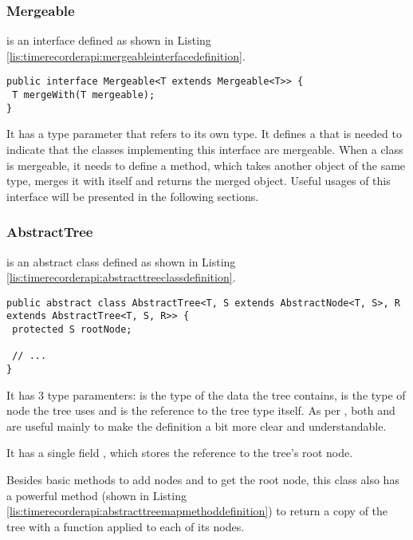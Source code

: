 \subsubsection{Mergeable}
 is an interface defined as shown in Listing \ref{lis:timerecorderapi:mergeableinterfacedefinition}.

\begin{lstlisting}[breaklines,caption={Mergeable interface definition},label=lis:timerecorderapi:mergeableinterfacedefinition]
public interface Mergeable<T extends Mergeable<T>> {
 T mergeWith(T mergeable);
}
\end{lstlisting}

\noindent It has a type parameter  that refers to its own type. It defines a  that is needed to indicate that the classes implementing this interface are mergeable. When a class is mergeable, it needs to define a  method, which takes another object of the same type, merges it with itself and returns the merged object. Useful usages of this interface will be presented in the following sections.

\subsubsection{AbstractTree}

 is an abstract class defined as shown in Listing \ref{lis:timerecorderapi:abstracttreeclassdefinition}.

\begin{lstlisting}[breaklines,caption={AbstractTree class definition},label=lis:timerecorderapi:abstracttreeclassdefinition]
public abstract class AbstractTree<T, S extends AbstractNode<T, S>, R extends AbstractTree<T, S, R>> {
 protected S rootNode;
 
 // ...
}
\end{lstlisting}

\noindent It has 3 type paramenters:  is the type of the data the tree contains,  is the type of node the tree uses and  is the reference to the tree type itself. As per , both  and  are useful mainly to make the definition a bit more clear and understandable.

\noindent It has a single field , which stores the reference to the tree's root node.

\noindent Besides basic methods to add nodes and to get the root node, this class also has a powerful  method (shown in Listing \ref{lis:timerecorderapi:abstracttreemapmethoddefinition}) to return a copy of the tree with a function applied to each of its nodes.

